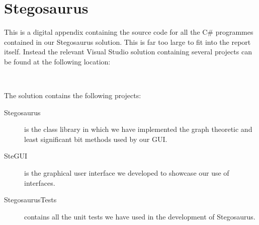 \chapter{Stegosaurus}
\label{app:C}
This is a digital appendix containing the source code for all the C\# programmes contained in our Stegosaurus solution. 
This is far too large to fit into the report itself.
Instead the relevant Visual Studio solution containing several projects can be found at the following location:

\setlength{\parindent}{0pt} {
 \\
}

The solution contains the following projects:
\begin{description}
\item[Stegosaurus]
is the class library in which we have implemented the graph theoretic and least significant bit methods used by our GUI.

\item[SteGUI]
is the graphical user interface we developed to showcase our use of interfaces.

\item[StegosaurusTests]
contains all the unit tests we have used in the development of Stegosaurus.
\end{description}